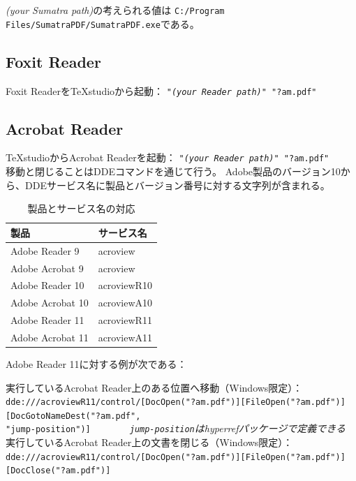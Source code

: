 \emph{(your Sumatra path)}の考えられる値は
\verb+C:/Program Files/SumatraPDF/SumatraPDF.exe+である。

\subsection{Foxit Reader}

Foxit ReaderをTeXstudioから起動：
 \texttt{"\emph{(your Reader path)"} "?am.pdf"}

\subsection{Acrobat Reader}

TeXstudioからAcrobat Readerを起動：
 \texttt{"\emph{(your Reader path)"} "?am.pdf"}\\


移動と閉じることはDDEコマンドを通じて行う。
Adobe製品のバージョン10から、DDEサービス名に製品とバージョン番号に対する文字列が含まれる。

\begin{table}[H]
  \centering
  \caption{製品とサービス名の対応}
  \begin{tabular}{ll}
    \hline
    \textbf{製品} & \textbf{サービス名}\\
    \hline
    Adobe Reader 9 & acroview\\
    Adobe Acrobat 9 & acroview\\
    Adobe Reader 10 & acroviewR10\\
    Adobe Acrobat 10 & acroviewA10\\
    Adobe Reader 11 & acroviewR11\\
    Adobe Acrobat 11 & acroviewA11\\
    \hline
  \end{tabular}
\end{table}

Adobe Reader 11に対する例が次である：


実行しているAcrobat Reader上のある位置へ移動（Windows限定）：\\
\texttt{dde:///acroviewR11/control/{[}DocOpen("?am.pdf"){]}{[}FileOpen("?am.pdf"){]}{[}DocGotoNameDest("?am.pdf",\\"jump-position"){]}}
~~ ~~ ~~\emph{\texttt{jump-position}はhyperrefパッケージで定義できる}\\


実行しているAcrobat Reader上の文書を閉じる（Windows限定）：\\
\texttt{dde:///acroviewR11/control/{[}DocOpen("?am.pdf"){]}{[}FileOpen("?am.pdf"){]}{[}DocClose("?am.pdf"){]}}

